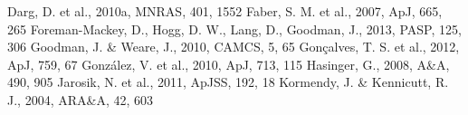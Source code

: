 \documentclass{mn2e}
\begin{document}
\begin{thebibliography}{}
 Darg, D. et al., 2010a, MNRAS, 401, 1552
 Faber, S. M. et al., 2007, ApJ, 665, 265
 Foreman-Mackey, D., Hogg, D. W., Lang, D., Goodman, J., 2013, PASP, 125, 306
 Goodman, J. \& Weare, J., 2010, CAMCS, 5, 65
 Gon\c calves, T. S. et al., 2012, ApJ, 759, 67
 Gonz\'alez, V. et al., 2010, ApJ, 713, 115
 Hasinger, G., 2008, A\&A, 490, 905
 Jarosik, N. et al., 2011, ApJSS, 192, 18
 Kormendy, J. \& Kennicutt, R. J., 2004, ARA\&A, 42, 603

\end{thebibliography}
\end{document}
